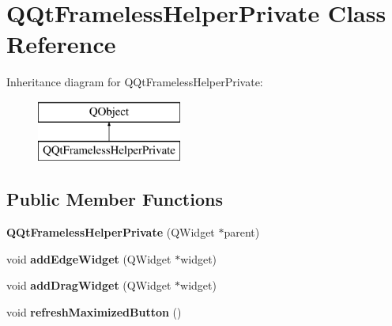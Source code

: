 \hypertarget{class_q_qt_frameless_helper_private}{}\section{Q\+Qt\+Frameless\+Helper\+Private Class Reference}
\label{class_q_qt_frameless_helper_private}
Inheritance diagram for Q\+Qt\+Frameless\+Helper\+Private\+:\begin{figure}[H]
\begin{center}
\leavevmode
\includegraphics[height=2.000000cm]{class_q_qt_frameless_helper_private}
\end{center}
\end{figure}
\subsection*{Public Member Functions}
\begin{DoxyCompactItemize}
\item 
\mbox{\label{class_q_qt_frameless_helper_private_a3aa9a9998c51eb07ce203183718cfb3d}} 
{\bfseries Q\+Qt\+Frameless\+Helper\+Private} (Q\+Widget $\ast$parent)
\item 
\mbox{\label{class_q_qt_frameless_helper_private_a9f105f4464e414518dd9adac4211af35}} 
void {\bfseries add\+Edge\+Widget} (Q\+Widget $\ast$widget)
\item 
\mbox{\label{class_q_qt_frameless_helper_private_aad4e0560a739a726ca45fb4e450f0474}} 
void {\bfseries add\+Drag\+Widget} (Q\+Widget $\ast$widget)
\item 
\mbox{\label{class_q_qt_frameless_helper_private_a753a89bce1b7388b681e82862f347c2e}} 
void {\bfseries refresh\+Maximized\+Button} ()
\end{DoxyCompactItemize}
